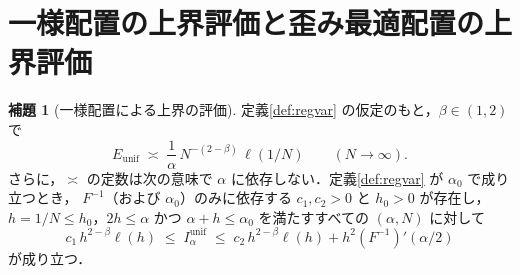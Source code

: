 \documentclass[a4paper,10pt]{jsarticle}
\theoremstyle{definition}
\newtheorem{lemma}{補題}[section]
\newcommand{\Finv}{F^{-1}}
\newcommand{\Eunif}{E_{\mathrm{unif}}}
\newcommand{\Iunif}{I_\alpha^{\mathrm{unif}}}
\begin{document}
\section{一様配置の上界評価と歪み最適配置の上界評価}
\label{sec:eval}

\begin{lemma}[一様配置による上界の評価]
\label{lem:unif}
定義\ref{def:regvar} の仮定のもと，$\beta\in(1,2)$ で
\begin{equation}
  \Eunif\;\asymp\;\frac1\alpha\,N^{-(2-\beta)}\,\ell(1/N)
  \qquad(N\to\infty).
  \label{eq:eunif}
\end{equation}
さらに，$\asymp$ の定数は次の意味で $\alpha$ に依存しない．定義\ref{def:regvar} が $\alpha_0$ で成り立つとき，
$\Finv$（および $\alpha_0$）のみに依存する $c_1,c_2>0$ と $h_0>0$ が存在し，
$h=1/N\le h_0$，$2h\le\alpha$ かつ $\alpha+h\le\alpha_0$ を満たすすべての $(\alpha,N)$ に対して
\begin{equation}
 c_1\,h^{2-\beta}\ell(h)\;\le\;\Iunif\;\le\;c_2\,h^{2-\beta}\ell(h)+h^2(\Finv)'(\alpha/2)
 \label{eq:unif-uniform}
\end{equation}
が成り立つ．
\end{lemma}
\end{document}
